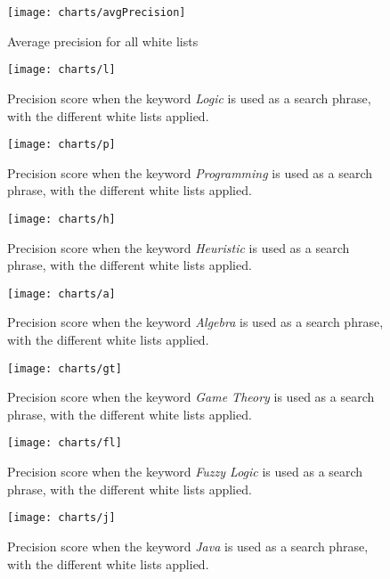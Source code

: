 
\begin{figure}[h] 
\caption{Average precision for all white lists}
\texttt{[image: charts/avgPrecision]}
\label{fig:avgPrecision}
\end{figure}

\begin{figure}[h] 
\caption{Precision score when the keyword \textit{Logic} is used as a search phrase, with the different white lists applied.}
\texttt{[image: charts/l]}
\label{fig:l}
\end{figure}

\begin{figure}[h] 
\caption{Precision score when the keyword \textit{Programming} is used as a search phrase, with the different white lists applied.}
\texttt{[image: charts/p]}
\label{fig:p}
\end{figure}

\begin{figure}[h] 
\caption{Precision score when the keyword \textit{Heuristic} is used as a search phrase, with the different white lists applied.}
\texttt{[image: charts/h]}
\label{fig:h}
\end{figure}

\begin{figure}[h] 
\caption{Precision score when the keyword \textit{Algebra} is used as a search phrase, with the different white lists applied.}
\texttt{[image: charts/a]}
\label{fig:a}
\end{figure}

\begin{figure}[h] 
\caption{Precision score when the keyword \textit{Game Theory} is used as a search phrase, with the different white lists applied.}
\texttt{[image: charts/gt]}
\label{fig:gt}
\end{figure}

\begin{figure}[h] 
\caption{Precision score when the keyword \textit{Fuzzy Logic} is used as a search phrase, with the different white lists applied.}
\texttt{[image: charts/fl]}
\label{fig:fl}
\end{figure}

\begin{figure}[h] 
\caption{Precision score when the keyword \textit{Java} is used as a search phrase, with the different white lists applied.}
\texttt{[image: charts/j]}
\label{fig:j}
\end{figure}

